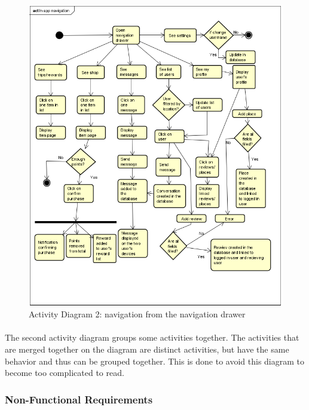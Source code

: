 \documentclass[paper=a4, fontsize=12pt,DIV=14]{scrartcl}    %
\begin{document}
		                \begin{figure}[!htbp]
		                    \center
		                    \includegraphics[scale=1]{img/act_navigation.png}
		                    \caption{Activity Diagram 2: navigation from the navigation drawer}
		                \end{figure}

		                \paragraph{}The second activity diagram groups some activities together. The activities that are merged together on the diagram are distinct activities, but have the same behavior and thus can be grouped together. This is done to avoid this diagram to become too complicated to read.



        		\subsubsection{Non-Functional Requirements}
\end{document}

